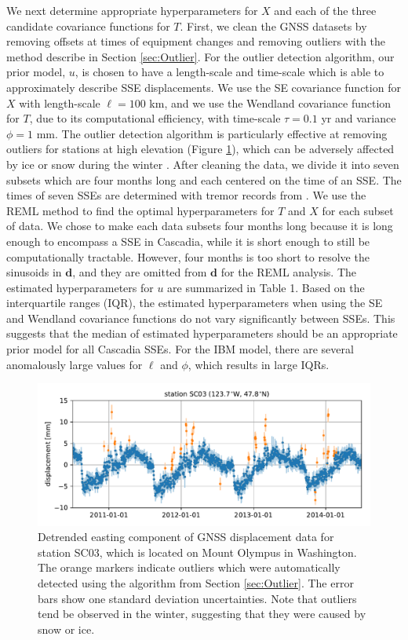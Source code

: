 \documentclass[10pt,letter]{article}
\begin{document}
We next determine appropriate hyperparameters for $X$ and each of the three candidate covariance functions for $T$. First, we clean the GNSS datasets by removing offsets at times of equipment changes and removing outliers with the method describe in Section \ref{sec:Outlier}. For the outlier detection algorithm, our prior model, $u$, is chosen to have a length-scale and time-scale which is able to approximately describe SSE displacements. We use the SE covariance function for $X$ with length-scale $\ell = 100$ km, and we use the Wendland covariance function for $T$, due to its computational efficiency, with time-scale $\tau = 0.1$ yr and variance $\phi = 1$ mm.  The outlier detection algorithm is particularly effective at removing outliers for stations at high elevation (Figure \ref{fig:Outliers}), which can be adversely affected by ice or snow during the winter \citep{Lisowski2008}. After cleaning the data, we divide it into seven subsets which are four months long and each centered on the time of an SSE. The times of seven SSEs are determined with tremor records from \cite{Wech2010}. We use the REML method to find the optimal hyperparameters for $T$ and $X$ for each subset of data. We chose to make each data subsets four months long because it is long enough to encompass a SSE in Cascadia, while it is short enough to still be computationally tractable. However, four months is too short to resolve the sinusoids in $\bm{d}$, and they are omitted from $\bm{d}$ for the REML analysis. The estimated hyperparameters for $u$ are summarized in Table 1. Based on the interquartile ranges (IQR), the estimated hyperparameters when using the SE and Wendland covariance functions do not vary significantly between SSEs. This suggests that the median of estimated hyperparameters should be an appropriate prior model for all Cascadia SSEs. For the IBM model, there are several anomalously large values for $\ell$ and $\phi$, which results in large IQRs.   

\begin{figure}
\includegraphics{figures/outliers/outliers.pdf}
\caption{Detrended easting component of GNSS displacement data for station SC03, which is located on Mount Olympus in Washington. The orange markers indicate outliers which were automatically detected using the algorithm from Section \ref{sec:Outlier}. The error bars show one standard deviation uncertainties. Note that outliers tend be observed in the winter, suggesting that they were caused by snow or ice.}   
\label{fig:Outliers}
\end{figure}
\end{document}
